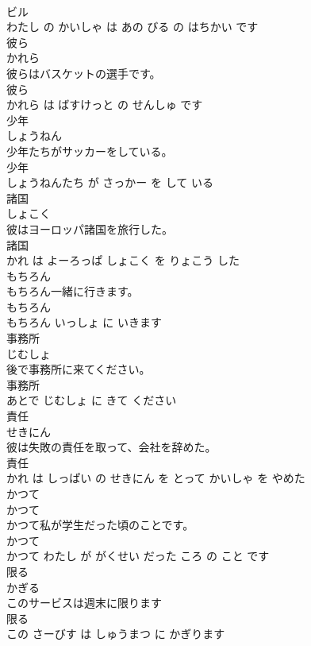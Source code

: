 \documentclass[8pt]{extreport}
\begin{document}
\begin{CJK}{UTF8}{min}
\\	ビル 
\\	わたし の かいしゃ は あの びる の はちかい です			
\\	彼ら	
\\	かれら			
\\	彼らはバスケットの選手です。	
\\	彼ら 
\\	かれら は ばすけっと の せんしゅ です			
\\	少年	
\\	しょうねん			
\\	少年たちがサッカーをしている。	
\\	少年 
\\	しょうねんたち が さっかー を して いる			
\\	諸国	
\\	しょこく			
\\	彼はヨーロッパ諸国を旅行した。	
\\	諸国 
\\	かれ は よーろっぱ しょこく を りょこう した			
\\	もちろん	
\\	もちろん一緒に行きます。	
\\	もちろん 
\\	もちろん いっしょ に いきます			
\\	事務所	
\\	じむしょ			
\\	後で事務所に来てください。	
\\	事務所 
\\	あとで じむしょ に きて ください			
\\	責任	
\\	せきにん			
\\	彼は失敗の責任を取って、会社を辞めた。	
\\	責任 
\\	かれ は しっぱい の せきにん を とって かいしゃ を やめた			
\\	かつて	
\\	かつて			
\\	かつて私が学生だった頃のことです。	
\\	かつて 
\\	かつて わたし が がくせい だった ころ の こと です			
\\	限る	
\\	かぎる			
\\	このサービスは週末に限ります	
\\	限る 
\\	この さーびす は しゅうまつ に かぎります			

\end{CJK}
\end{document}
